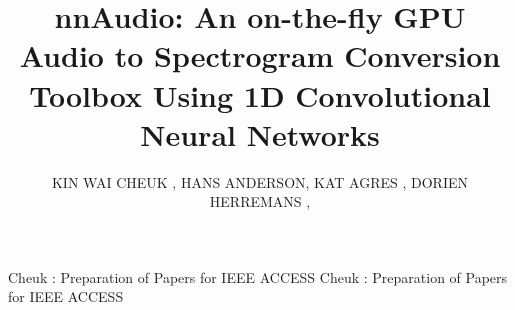 \documentclass{ieeeaccess}
\begin{document}

\title{nnAudio: An on-the-fly GPU Audio to Spectrogram Conversion Toolbox Using 1D Convolutional Neural Networks}
\author{\uppercase{Kin Wai Cheuk} ,
\uppercase{Hans Anderson}, \uppercase{Kat Agres} , \uppercase{Dorien Herremans} ,}
\address[1]{Information Systems, Technology and Design, Singapore University of Technology and Design, 8 Somapah Rd, Singapore 487372 (e-mail: kinwai\_cheuk@mymail.sutd.edu.sg, dorien\_herremans@sutd.edu.sg)}
\address[2]{Institute of High Performance Computing, Agency for Science, Technology and Research, 1 Fusionopolis Way, \#16-16 Connexis, Singapore 138632}
\address[3]{Blue Mangoo Software (email: hans@bluemangoo.com)}
\address[4]{Yong Siew Toh Conservatory of Music, National University of Singapore, 3 Conservatory Drive, Singapore 117376 (e-mail: katagres@nus.edu.sg)}

\markboth
{Cheuk \headeretal: Preparation of Papers for IEEE ACCESS}
{Cheuk \headeretal: Preparation of Papers for IEEE ACCESS}

\end{document}
